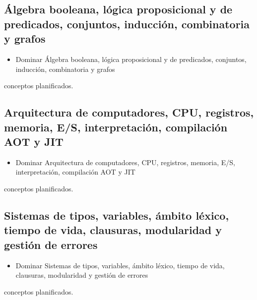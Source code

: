 \documentclass{book}
\begin{document}
\subsection*{\checkmark Álgebra booleana, lógica proposicional y de predicados, conjuntos, inducción, combinatoria y grafos}
\begin{itemize}
\item Dominar Álgebra booleana, lógica proposicional y de predicados, conjuntos, inducción, combinatoria y grafos
\end{itemize}
 conceptos planificados.

\subsection*{\checkmark Arquitectura de computadores, CPU, registros, memoria, E/S, interpretación, compilación AOT y JIT}
\begin{itemize}
\item Dominar Arquitectura de computadores, CPU, registros, memoria, E/S, interpretación, compilación AOT y JIT
\end{itemize}
 conceptos planificados.

\subsection*{\checkmark Sistemas de tipos, variables, ámbito léxico, tiempo de vida, clausuras, modularidad y gestión de errores}
\begin{itemize}
\item Dominar Sistemas de tipos, variables, ámbito léxico, tiempo de vida, clausuras, modularidad y gestión de errores
\end{itemize}
 conceptos planificados.
\end{document}
